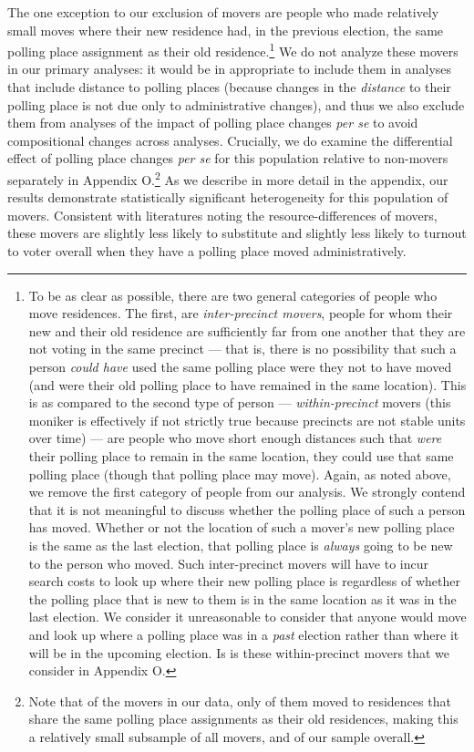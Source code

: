 \documentclass{cup_PSRM}
\begin{document}
The one exception to our exclusion of movers are people who made relatively small moves where their new residence had, in the previous election, the same polling place assignment as their old residence.\footnote{To be as clear as possible, there are two general categories of people who move residences.  The first, are \emph{inter-precinct movers}, people for whom their new and their old residence are sufficiently far from one another that they are not voting in the same precinct --- that is, there is no possibility that such a person \emph{could have} used the same polling place were they not to have moved (and were their old polling place to have remained in the same location).  This is as compared to the second type of person --- \emph{within-precinct} movers (this moniker is effectively if not strictly true because precincts are not stable units over time) --- are people who move short enough distances such that \emph{were} their polling place to remain in the same location, they could use that same polling place (though that polling place may move).  Again, as noted above, we remove the first category of people from our analysis.  We strongly contend that it is not meaningful to discuss whether the polling place of such a person has moved.  Whether or not the location of such a mover's new polling place is the same as the last election, that polling place is \emph{always} going to be new to the person who moved.  Such inter-precinct movers will have to incur search costs to look up where their new polling place is regardless  of whether the polling place that is new to them is in the same location as it was in the last election.  We consider it unreasonable to consider that anyone would move and look up where a polling place was in a \emph{past} election rather than where it will be in the upcoming election.  Is is these within-precinct movers that we consider in Appendix O.} We do not analyze these movers in our primary analyses: it would be in appropriate to include them in analyses that include distance to polling places (because changes in the \emph{distance} to their polling place is not due only to administrative changes), and thus we also exclude them from analyses of the impact of polling place changes \emph{per se} to avoid compositional changes across analyses.  Crucially, we do examine the differential effect of polling place changes \emph{per se} for this population relative to non-movers separately in Appendix O.\footnote{Note that of the  movers in our data, only  of them moved to residences that share the same polling place assignments as their old residences, making this a relatively small subsample of all movers, and of our sample overall.}  As we describe in more detail in the appendix, our results demonstrate statistically significant heterogeneity for this population of movers.  Consistent with literatures noting the resource-differences of movers, these movers are slightly less likely to substitute and slightly less likely to turnout to voter overall when they have a polling place moved administratively.
\end{document}
